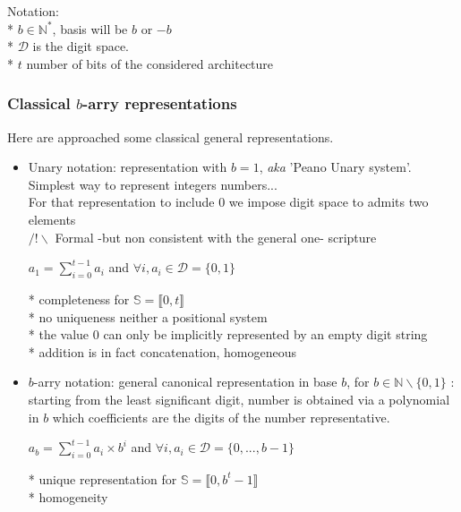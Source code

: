 Notation: \\
* $b \in \mathbb{N}^*$, basis will be $b$ or $-b$ \\
* $ \mathcal{D} $ is the digit space.\\
* $t$ number of bits of the considered architecture

\subsubsection{Classical $b$-arry representations}
Here are approached some classical general representations.

\begin{itemize}
	\item Unary notation: representation with $b=1$, \textit{aka} 'Peano Unary system'.\\
		Simplest way to represent integers numbers...\\
		For that representation to include $0$ we impose digit space to admits two elements\\
		$/!\backslash$ Formal -but non consistent with the general one- scripture
		\begin{small}
			\begin{center}	
		$ a_{1} = \sum \limits_{i=0}^{t-1} a_i$ and $\forall i, a_i \in \mathcal{D} =\{0,1\}$ 	
			\end{center}
		\end{small}
		* completeness for $\mathbb{S} = \llbracket 0, t \rrbracket$ \\
		* no uniqueness neither a positional system\\
		* the value 0 can only be implicitly represented by an empty digit string\\
		* addition is in fact concatenation, homogeneous\\
		
	\item $b$-arry notation: general canonical representation in base $b$, for $b \in \mathbb{N} \backslash \{0,1\} $ :\\	
		starting from the least significant digit, number is obtained via a polynomial in $b$ which coefficients are the digits of the number representative.
		\begin{small}
			\begin{center}	
				$ a_{b} = \sum \limits_{i=0}^{t-1} a_i \times b^i$ 
				and $\forall i, a_i \in	\mathcal{D} = \{0, ..., b-1\}$		
			\end{center}
		\end{small}	
		* unique representation for $\mathbb{S} =\llbracket 0, b^{t}-1\rrbracket$\\
		* homogeneity


\end{itemize}
